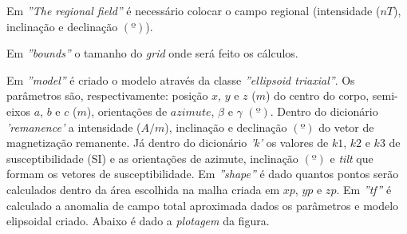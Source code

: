 Em \textit{''The regional field''} é necessário colocar o campo regional (intensidade ($nT$), inclinação e declinação $(º)$).

Em \textit{''bounds''} o tamanho do \textit{grid} onde será feito os cálculos.

Em \textit{''model''} é criado o modelo através da classe \textit{''ellipsoid triaxial''}. Os parâmetros são, respectivamente: posição $x$, $y$ e $z$ ($m$) do centro do corpo, semi-eixos $a$, $b$ e $c$ ($m$), orientações de $azimute$, $\beta$ e $\gamma$ $(º)$. 
Dentro do dicionário \textit{'remanence'} a intensidade ($A/m$), inclinação e declinação $(º)$ do vetor de magnetização remanente. Já dentro do dicionário \textit{'k'} os valores de $k1$, $k2$ e $k3$ de susceptibilidade (SI) e as orientações de azimute, inclinação $(º)$ e \textit{tilt} que formam os vetores de susceptibilidade.
Em  \textit{''shape''} é dado quantos pontos serão calculados dentro da área escolhida na malha criada em $xp$, $yp$ e $zp$.
Em \textit{''tf''} é calculado a anomalia de campo total aproximada dados os parâmetros e modelo elipsoidal criado.
Abaixo é dado a \textit{plotagem} da figura.

